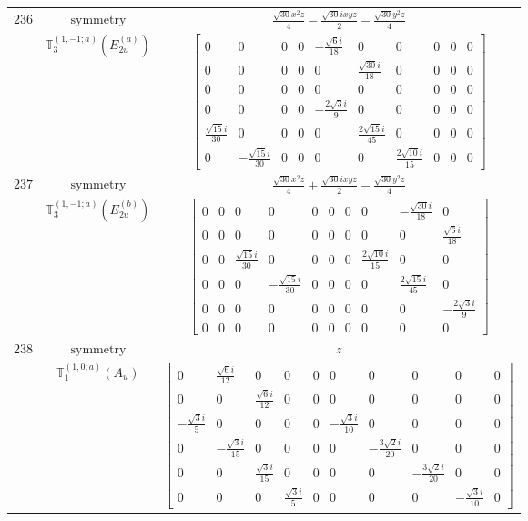 \documentclass[fleqn,8pt,landscape]{jsarticle}
\begin{document}
\begin{longtable}{ccc}
$ 236 $ & $ \text{symmetry} $ & $ \frac{\sqrt{30} x^{2} z}{4} - \frac{\sqrt{30} i x y z}{2} - \frac{\sqrt{30} y^{2} z}{4} $ \\
$  $ & $ \mathbb{T}_{3}^{(1,-1;a)}(E_{2u}^{(a)}) $ & $ \begin{bmatrix} 0 & 0 & 0 & 0 & - \frac{\sqrt{6} i}{18} & 0 & 0 & 0 & 0 & 0 \\ 0 & 0 & 0 & 0 & 0 & \frac{\sqrt{30} i}{18} & 0 & 0 & 0 & 0 \\ 0 & 0 & 0 & 0 & 0 & 0 & 0 & 0 & 0 & 0 \\ 0 & 0 & 0 & 0 & - \frac{2 \sqrt{3} i}{9} & 0 & 0 & 0 & 0 & 0 \\ \frac{\sqrt{15} i}{30} & 0 & 0 & 0 & 0 & \frac{2 \sqrt{15} i}{45} & 0 & 0 & 0 & 0 \\ 0 & - \frac{\sqrt{15} i}{30} & 0 & 0 & 0 & 0 & \frac{2 \sqrt{10} i}{15} & 0 & 0 & 0 \end{bmatrix} $ \\ \hline
$ 237 $ & $ \text{symmetry} $ & $ \frac{\sqrt{30} x^{2} z}{4} + \frac{\sqrt{30} i x y z}{2} - \frac{\sqrt{30} y^{2} z}{4} $ \\
$  $ & $ \mathbb{T}_{3}^{(1,-1;a)}(E_{2u}^{(b)}) $ & $ \begin{bmatrix} 0 & 0 & 0 & 0 & 0 & 0 & 0 & 0 & - \frac{\sqrt{30} i}{18} & 0 \\ 0 & 0 & 0 & 0 & 0 & 0 & 0 & 0 & 0 & \frac{\sqrt{6} i}{18} \\ 0 & 0 & \frac{\sqrt{15} i}{30} & 0 & 0 & 0 & 0 & \frac{2 \sqrt{10} i}{15} & 0 & 0 \\ 0 & 0 & 0 & - \frac{\sqrt{15} i}{30} & 0 & 0 & 0 & 0 & \frac{2 \sqrt{15} i}{45} & 0 \\ 0 & 0 & 0 & 0 & 0 & 0 & 0 & 0 & 0 & - \frac{2 \sqrt{3} i}{9} \\ 0 & 0 & 0 & 0 & 0 & 0 & 0 & 0 & 0 & 0 \end{bmatrix} $ \\ \hline
$ 238 $ & $ \text{symmetry} $ & $ z $ \\
$  $ & $ \mathbb{T}_{1}^{(1,0;a)}(A_{u}) $ & $ \begin{bmatrix} 0 & \frac{\sqrt{6} i}{12} & 0 & 0 & 0 & 0 & 0 & 0 & 0 & 0 \\ 0 & 0 & \frac{\sqrt{6} i}{12} & 0 & 0 & 0 & 0 & 0 & 0 & 0 \\ - \frac{\sqrt{3} i}{5} & 0 & 0 & 0 & 0 & - \frac{\sqrt{3} i}{10} & 0 & 0 & 0 & 0 \\ 0 & - \frac{\sqrt{3} i}{15} & 0 & 0 & 0 & 0 & - \frac{3 \sqrt{2} i}{20} & 0 & 0 & 0 \\ 0 & 0 & \frac{\sqrt{3} i}{15} & 0 & 0 & 0 & 0 & - \frac{3 \sqrt{2} i}{20} & 0 & 0 \\ 0 & 0 & 0 & \frac{\sqrt{3} i}{5} & 0 & 0 & 0 & 0 & - \frac{\sqrt{3} i}{10} & 0 \end{bmatrix} $ \\ \hline

\end{longtable}
\end{document}
